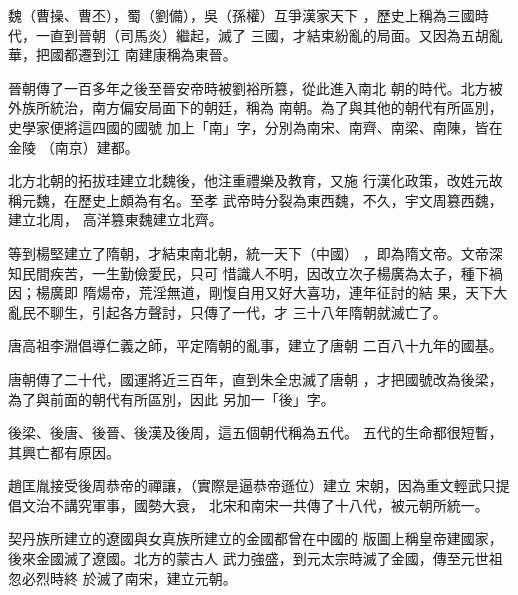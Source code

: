 \documentclass[avery5371,grid]{flashcards}
\begin{document}
{魏（曹操、曹丕），蜀（劉備），吳（孫權）互爭漢家天下
，歷史上稱為三國時代，一直到晉朝（司馬炎）繼起，滅了
三國，才結束紛亂的局面。又因為五胡亂華，把國都遷到江
南建康稱為東晉。} %
{} %

{晉朝傳了一百多年之後至晉安帝時被劉裕所篡，從此進入南北
朝的時代。北方被外族所統治，南方偏安局面下的朝廷，稱為
南朝。為了與其他的朝代有所區別，史學家便將這四國的國號
加上「南」字，分別為南宋、南齊、南梁、南陳，皆在金陵
（南京）建都。} %
{} %

{北方北朝的拓拔珪建立北魏後，他注重禮樂及教育，又施
行漢化政策，改姓元故稱元魏，在歷史上頗為有名。至孝
武帝時分裂為東西魏，不久，宇文周篡西魏，建立北周，
高洋篡東魏建立北齊。} %
{} %

{等到楊堅建立了隋朝，才結束南北朝，統一天下（中國）
，即為隋文帝。文帝深知民間疾苦，一生勤儉愛民，只可
惜識人不明，因改立次子楊廣為太子，種下禍因；楊廣即
隋煬帝，荒淫無道，剛愎自用又好大喜功，連年征討的結
果，天下大亂民不聊生，引起各方聲討，只傳了一代，才
三十八年隋朝就滅亡了。} %
{} %




{唐高祖李淵倡導仁義之師，平定隋朝的亂事，建立了唐朝
二百八十九年的國基。} %
{} %

{唐朝傳了二十代，國運將近三百年，直到朱全忠滅了唐朝
，才把國號改為後梁，為了與前面的朝代有所區別，因此
另加一「後」字。} %
{} %

{後梁、後唐、後晉、後漢及後周，這五個朝代稱為五代。
五代的生命都很短暫，其興亡都有原因。} %
{} %

{趙匡胤接受後周恭帝的禪讓，（實際是逼恭帝遜位）建立
宋朝，因為重文輕武只提倡文治不講究軍事，國勢大衰，
北宋和南宋一共傳了十八代，被元朝所統一。} %
{} %

{契丹族所建立的遼國與女真族所建立的金國都曾在中國的
版圖上稱皇帝建國家，後來金國滅了遼國。北方的蒙古人
武力強盛，到元太宗時滅了金國，傳至元世祖忽必烈時終
於滅了南宋，建立元朝。} %
{} %
\end{document}

